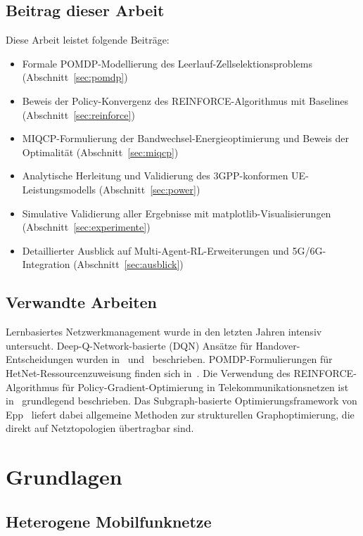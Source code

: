 ﻿\documentclass[a4paper,12pt]{article}
\theoremstyle{definition}
\begin{document}
\subsection{Beitrag dieser Arbeit}

Diese Arbeit leistet folgende Beiträge:
\begin{itemize}
  \item Formale POMDP-Modellierung des Leerlauf-Zellselektionsproblems (Abschnitt~\ref{sec:pomdp})
  \item Beweis der Policy-Konvergenz des REINFORCE-Algorithmus mit Baselines (Abschnitt~\ref{sec:reinforce})
  \item MIQCP-Formulierung der Bandwechsel-Energieoptimierung und Beweis der Optimalität (Abschnitt~\ref{sec:miqcp})
  \item Analytische Herleitung und Validierung des 3GPP-konformen UE-Leistungsmodells (Abschnitt~\ref{sec:power})
  \item Simulative Validierung aller Ergebnisse mit matplotlib-Visualisierungen (Abschnitt~\ref{sec:experimente})
  \item Detaillierter Ausblick auf Multi-Agent-RL-Erweiterungen und 5G/6G-Integration (Abschnitt~\ref{sec:ausblick})
\end{itemize}

\subsection{Verwandte Arbeiten}

Lernbasiertes Netzwerkmanagement wurde in den letzten Jahren intensiv untersucht.
Deep-Q-Network-basierte (DQN) Ansätze für Handover-Entscheidungen wurden in~\cite{fehske2011}
und~\cite{zhang2019} beschrieben. POMDP-Formulierungen für HetNet-Ressourcenzuweisung finden
sich in~\cite{li2020}. Die Verwendung des REINFORCE-Algorithmus f\"ur Policy-Gradient-Optimierung
in Telekommunikationsnetzen ist in~\cite{sutton2018} grundlegend beschrieben. Das Subgraph-basierte
Optimierungsframework von Epp~\cite{epp2026sub} liefert dabei allgemeine Methoden zur strukturellen
Graphoptimierung, die direkt auf Netztopologien übertragbar sind.

\section{Grundlagen}

\subsection{Heterogene Mobilfunknetze}
\end{document}
